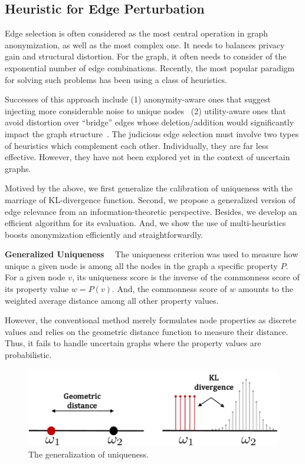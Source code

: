 \subsection{Heuristic for Edge Perturbation}
Edge selection is often considered as the most central operation in graph anonymization, as well as the most complex one. 
It needs to balances privacy gain and structural distortion. 
For the graph, it often needs to consider of the exponential number of edge combinations. 
Recently, the most popular paradigm for solving such problems has been using a class of heuristics. 

Successes of this approach include
(1) anonymity-aware ones that suggest injecting more considerable noise to unique nodes~\cite{Ying2009,Boldi_Injecting_2012,Hay_Anonymizing_2007} 
(2) utility-aware ones that avoid distortion over “bridge” edges whose deletion/addition would significantly impact the graph structure~\cite{Wang2011,Ninggal_Utility_2015}. 
The judicious edge selection must involve two types of heuristics which complement each other. 
Individually, they are far less effective. 
However, they have not been explored yet in the context of uncertain graphs.

Motived by the above, we first generalize the calibration of uniqueness with the marriage of KL-divergence function. 
Second, we propose a generalized version of edge relevance from an information-theoretic perspective.
Besides, we develop an efficient algorithm for its evaluation.
And, we show the use of multi-heuristics boosts anonymization efficiently and straightforwardly.

\textbf{Generalized Uniqueness}~~
The uniqueness criterion was used to measure how unique a given node is among all the nodes in the graph {\wrt} a specific property $P$. 
For a given node $v$, its uniqueness score is the inverse of the commonness score of its property value $w=P(v)$.
And, the commonness score of $w$ amounts to the weighted average distance among all other property values.

However, the conventional method merely formulates node properties as discrete values and relies on the geometric distance function to measure their distance.  
Thus, it fails to handle uncertain graphs where the property values are probabilistic.

\begin{figure}[tb]
  \centering
        \includegraphics[width=\linewidth]{ill/shift_distance.pdf}
  \caption{The generalization of uniqueness.}
\end{figure}

